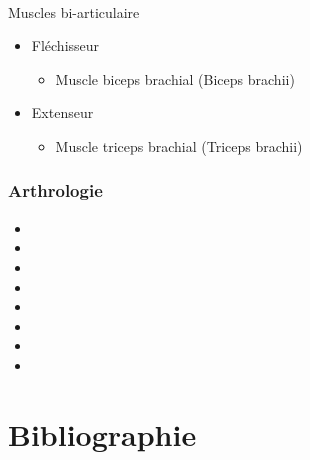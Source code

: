 \documentclass[pdftex,a4paper,11pt]{article}
\numberwithin{equation}{subsection}
\begin{document}
\paragraph{}
Muscles bi-articulaire
\begin{itemize}
    \item Fléchisseur
    \begin{itemize}
        \item Muscle biceps brachial (Biceps brachii)
    \end{itemize}
    \item Extenseur
    \begin{itemize}
        \item Muscle triceps brachial (Triceps brachii)
    \end{itemize}
\end{itemize}

\subsubsection{Arthrologie}

\begin{itemize}
    \item 
    \item 
    \item 
    \item 
    \item 
    \item 
    \item 
    \item 
\end{itemize}



\section{Bibliographie}




\end{document}
